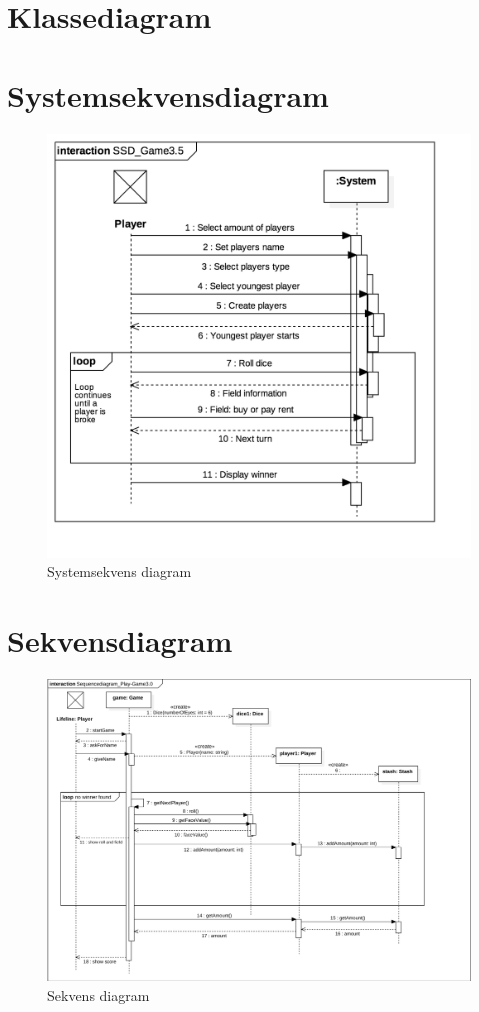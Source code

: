 \section{Klassediagram}

\pagebreak

\section{Systemsekvensdiagram}
\begin{figure}[H]
    \begin{center}
        \includegraphics[width=\columnwidth]{graphics/domain/SSD_Game35.png}
        \caption{Systemsekvens diagram}
        \label{fig:systemsekvens_diagram}
    \end{center}
\end{figure}

\section{Sekvensdiagram}
\begin{figure}[H]
    \begin{center}
        \includegraphics[width=\columnwidth]{graphics/domain/SD_Game3.png}
        \caption{Sekvens diagram}
        \label{fig:sekvens_diagram}
    \end{center}
\end{figure}
